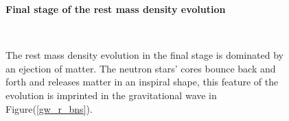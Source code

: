 \begin{figure}
\centering
    \textbf{Final stage of the rest mass density evolution}\par\medskip
\centering
{} \quad
    \quad
{} \quad
{} \quad
 \\
\caption{The rest mass density evolution in the final stage is dominated by an ejection of matter. The neutron stars' cores bounce back and forth and releases matter in an inspiral shape, this feature of the evolution is imprinted in the gravitational wave in Figure(\ref{gw_r_bns}).}
\label{f_5678}
\end{figure}
